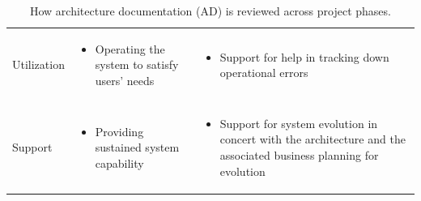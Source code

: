 \documentclass[11pt]{article}
\begin{document}
\begin{table}[h!]
\begin{tabularx}{\textwidth}{@{}lXX@{}}
    Utilization &
    \begin{itemize}
      \item Operating the system to satisfy users' needs
    \end{itemize}
    &
    \begin{itemize}
      \item Support for help in tracking down operational errors
    \end{itemize}
    \\[0.5em]

    Support &
    \begin{itemize}
      \item Providing sustained system capability
    \end{itemize}
    &
    \begin{itemize}
      \item Support for system evolution in concert with the architecture and the associated business planning for evolution
    \end{itemize}
    \\
    \bottomrule
  \end{tabularx}
  \caption{How architecture documentation (AD) is reviewed across project phases.}
\end{table}
\end{document}
